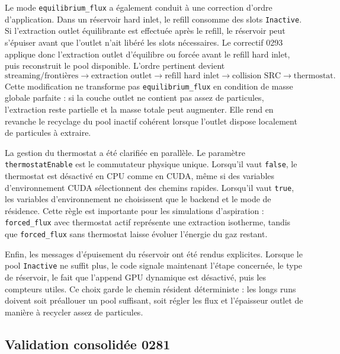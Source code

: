 \documentclass[11pt,a4paper]{article}
\begin{document}
Le mode \texttt{equilibrium\_flux} a également conduit à une correction d'ordre d'application. Dans un réservoir hard inlet, le refill consomme des slots \texttt{Inactive}. Si l'extraction outlet équilibrante est effectuée après le refill, le réservoir peut s'épuiser avant que l'outlet n'ait libéré les slots nécessaires. Le correctif 0293 applique donc l'extraction outlet d'équilibre ou forcée avant le refill hard inlet, puis reconstruit le pool disponible. L'ordre pertinent devient
\begin{equation}
  \text{streaming/frontières}
  \longrightarrow
  \text{extraction outlet}
  \longrightarrow
  \text{refill hard inlet}
  \longrightarrow
  \text{collision SRC}
  \longrightarrow
  \text{thermostat}.
\end{equation}
Cette modification ne transforme pas \texttt{equilibrium\_flux} en condition de masse globale parfaite : si la couche outlet ne contient pas assez de particules, l'extraction reste partielle et la masse totale peut augmenter. Elle rend en revanche le recyclage du pool inactif cohérent lorsque l'outlet dispose localement de particules à extraire.

La gestion du thermostat a été clarifiée en parallèle. Le paramètre \texttt{thermostatEnable} est le commutateur physique unique. Lorsqu'il vaut \texttt{false}, le thermostat est désactivé en CPU comme en CUDA, même si des variables d'environnement CUDA sélectionnent des chemins rapides. Lorsqu'il vaut \texttt{true}, les variables d'environnement ne choisissent que le backend et le mode de résidence. Cette règle est importante pour les simulations d'aspiration : \texttt{forced\_flux} avec thermostat actif représente une extraction isotherme, tandis que \texttt{forced\_flux} sans thermostat laisse évoluer l'énergie du gaz restant.

Enfin, les messages d'épuisement du réservoir ont été rendus explicites. Lorsque le pool \texttt{Inactive} ne suffit plus, le code signale maintenant l'étape concernée, le type de réservoir, le fait que l'append GPU dynamique est désactivé, puis les compteurs utiles. Ce choix garde le chemin résident déterministe : les longs runs doivent soit préallouer un pool suffisant, soit régler les flux et l'épaisseur outlet de manière à recycler assez de particules.

\subsection{Validation consolidée 0281}
\end{document}
